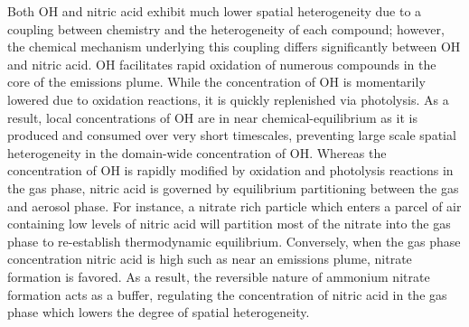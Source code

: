 \documentclass[journal abbreviation, manuscript]{copernicus}
\begin{document}
Both OH and nitric acid exhibit much lower spatial heterogeneity due to a 
coupling between chemistry and the heterogeneity of each compound; 
however, the chemical mechanism underlying this coupling differs significantly 
between OH and nitric acid. OH facilitates rapid oxidation of numerous compounds
in the core of the emissions plume. While the concentration of OH is momentarily 
lowered due to oxidation reactions, it is quickly replenished via photolysis. 
As a result, local concentrations of OH are in near chemical-equilibrium as
it is produced and consumed over very short timescales, preventing
large scale spatial heterogeneity in the domain-wide concentration of
OH. Whereas the concentration of OH is rapidly modified by oxidation and 
photolysis reactions in the gas phase, nitric acid is governed by equilibrium 
partitioning between the gas and aerosol phase. For instance, a nitrate rich 
particle which enters a parcel of air containing low levels of nitric acid will partition 
most of the nitrate into the gas phase to re-establish thermodynamic equilibrium.
Conversely, when the gas phase concentration nitric acid is high such as near an 
emissions plume, nitrate formation is favored. As a result, the reversible nature of 
ammonium nitrate formation acts as a buffer, regulating the concentration of nitric acid 
in the gas phase which lowers the degree of spatial heterogeneity.




\end{document}
